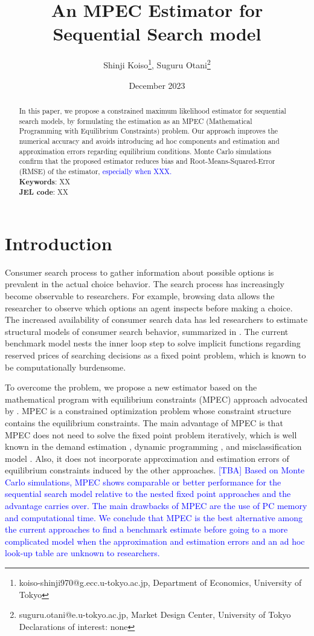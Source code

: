 \documentclass[12pt]{article}
\title{An MPEC Estimator for Sequential Search model}
\author{Shinji Koiso\thanks{koiso-shinji970@g.ecc.u-tokyo.ac.jp, Department of Economics, University of Tokyo}, Suguru Otani\thanks{suguru.otani@e.u-tokyo.ac.jp, Market Design Center, University of Tokyo\\Declarations of interest: none}}
\date{December 2023}
\begin{document}
\maketitle

\begin{abstract}
\noindent
In this paper, we propose a constrained maximum likelihood estimator for sequential search models, by formulating the estimation as an MPEC (Mathematical Programming with Equilibrium Constraints) problem. 
Our approach improves the numerical accuracy and avoids introducing ad hoc components and estimation and approximation errors regarding equilibrium conditions. 
Monte Carlo simulations confirm that the proposed estimator reduces bias and Root-Means-Squared-Error (RMSE) of the estimator, \textcolor{blue}{especially when XXX.}
\\
\textbf{Keywords}: XX \\
\textbf{JEL code}: XX
\end{abstract}

\section{Introduction}

Consumer search process to gather information about possible options is prevalent in the actual choice behavior.
The search process has increasingly become observable to researchers. 
For example, browsing data allows the researcher to observe which options an agent inspects before making a choice. 
The increased availability of consumer search data has led researchers to estimate structural models of consumer search behavior, summarized in \cite{ursu2023sequential}. 
The current benchmark model nests the inner loop step to solve implicit functions regarding reserved prices of searching decisions as a fixed point problem, which is known to be computationally burdensome.

To overcome the problem, we propose a new estimator based on the mathematical program
with equilibrium constraints (MPEC) approach advocated by \cite{su2012constrained}. 
MPEC is a constrained optimization problem whose constraint structure contains the equilibrium constraints.
The main advantage of MPEC is that MPEC does not need to solve the fixed point problem iteratively, which is well known in the demand estimation \citep{dube2012improving}, dynamic programming \citep{su2012constrained,egesdal2015estimating}, and misclassification model \citep{lu2014mpec}.
Also, it does not incorporate approximation and estimation errors of equilibrium constraints induced by the other approaches.
\textcolor{blue}{
[TBA] Based on Monte Carlo simulations, MPEC shows comparable or better performance for the sequential search model relative to the nested fixed point approaches and the advantage carries over. 
The main drawbacks of MPEC are the use of PC memory and computational time.
We conclude that MPEC is the best alternative among the current approaches to find a benchmark estimate before going to a more complicated model when the approximation and estimation errors and an ad hoc look-up table are unknown to researchers. 
}
\end{document}
